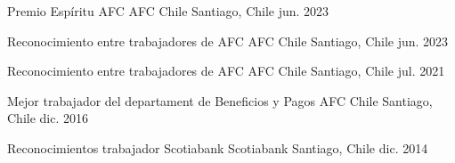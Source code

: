 
\begin{cvhonors}

  \cvhonor
    {Premio Espíritu AFC} %
    {AFC Chile} %
    {Santiago, Chile} %
    {jun. 2023} %

  \cvhonor
    {Reconocimiento entre trabajadores de AFC} %
    {AFC Chile}
    {Santiago, Chile} %
    {jun. 2023} %

  \cvhonor
    {Reconocimiento entre trabajadores de AFC} %
    {AFC Chile}
    {Santiago, Chile} %
    {jul. 2021} %

  \cvhonor
    {Mejor trabajador del departament de Beneficios y Pagos} %
    {AFC Chile}
    {Santiago, Chile} %
    {dic. 2016} %

  \cvhonor
    {Reconocimientos trabajador Scotiabank} %
    {Scotiabank}
    {Santiago, Chile} %
    {dic. 2014} %
\end{cvhonors}
